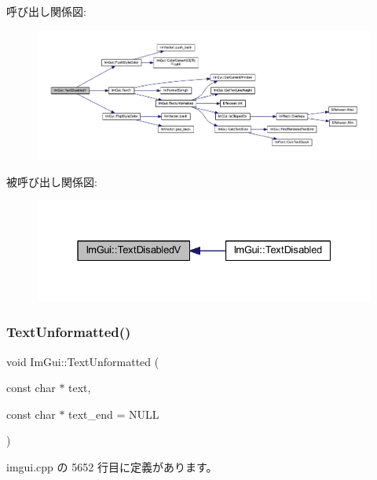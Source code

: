 呼び出し関係図\+:\nopagebreak
\begin{figure}[H]
\begin{center}
\leavevmode
\includegraphics[width=350pt]{namespace_im_gui_a5b128d4f12d7e33e95fb9cef7dce027e_cgraph}
\end{center}
\end{figure}
被呼び出し関係図\+:\nopagebreak
\begin{figure}[H]
\begin{center}
\leavevmode
\includegraphics[width=331pt]{namespace_im_gui_a5b128d4f12d7e33e95fb9cef7dce027e_icgraph}
\end{center}
\end{figure}
\mbox{\label{namespace_im_gui_a96a5f42789ecc419b2ae8af7b2acc28e}} 
\subsubsection{\texorpdfstring{Text\+Unformatted()}{TextUnformatted()}}
{\footnotesize\ttfamily void Im\+Gui\+::\+Text\+Unformatted (\begin{DoxyParamCaption}\item[{const char $\ast$}]{text,  }\item[{const char $\ast$}]{text\+\_\+end = {\ttfamily NULL} }\end{DoxyParamCaption})}



 imgui.\+cpp の 5652 行目に定義があります。

